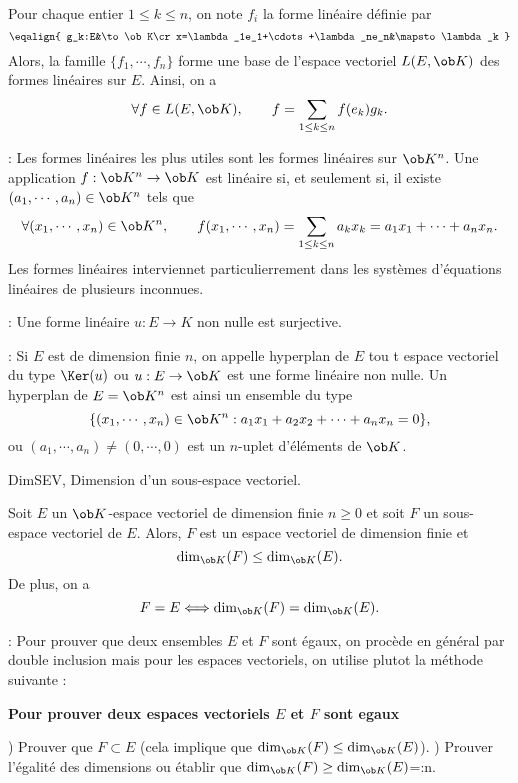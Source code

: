  Pour chaque entier $1\le k\le n$, on note $f_i$ la forme lin\'eaire d\'efinie par 
$$
\eqalign{
	g_k:E&\to\ob K\cr  
	x=\lambda_1e_1+\cdots+\lambda_ne_n&\mapsto  \lambda_k
}
$$
Alors, la famille $\{f_1,\cdots,f_n\}$ forme une base de l'espace vectoriel $\sc L(E,\ob K)$ des formes lin\'eaires sur $E$. Ainsi, on a 
$$
\forall f\in\sc L(E,\ob K), \qquad f=\sum_{1\le k\le n}f(e_k)g_k.
$$

\Remarque : Les formes lin\'eaires les plus utiles sont les formes lin\'eaires sur $\ob K^n$. Une application $f:\ob K^n\to\ob K$ est lin\'eaire si, et seulement si, il existe $(a_1,\cdots,a_n)\in\ob K^n$ tels que 
$$
\forall (x_1,\cdots,x_n)\in\ob K^n, \qquad f(x_1,\cdots,x_n)=\sum_{1\le k\le n}a_kx_k=a_1x_1+\cdots+a_nx_n.
$$
Les formes lin\'eaires interviennet particulierrement dans les syst\`emes d'\'equations lin\'eaires de plusieurs inconnues. 
\bigskip

\Remarque : Une forme lin\'eaire $u:E\to K$ non nulle est surjective. 
\bigskip

\Remarque : Si $E$ est de dimension finie $n$, on appelle hyperplan de $E$ tou t espace vectoriel du type $\Ker(u)$ ou $u:E\to\ob K$ est une forme lin\'eaire non nulle. Un hyperplan de $E=\ob K^n$ est ainsi un ensemble du type 
$$
\{(x_1,\cdots,x_n)\in\ob K^n:a_1x_1+a_2x_2+\cdots+a_nx_n=0\},
$$
ou $(a_1,\cdots,a_n)\neq (0,\cdots,0)$ est un $n$-uplet d'\'el\'ements de $\ob K$. 
\bigskip


\Subsection DimSEV, Dimension d'un sous-espace vectoriel. 
\bigskip

\Propriete []  Soit $E$ un $\ob K$-espace vectoriel de dimension finie $n\ge0$ et soit $F$ un sous-espace vectoriel de $E$. 
Alors, $F$ est un espace vectoriel de dimension finie et $$
{\dim_{\ob K}(F)\le\dim_{\ob K}(E)}. 
$$
De plus, on a 
$$
{F=E\Longleftrightarrow \dim_{\ob K}(F)=\dim_{\ob K}(E)}.
$$


\Remarque : Pour prouver que deux ensembles $E$ et $F$ sont \'egaux, on proc\`ede en g\'en\'eral par double inclusion mais pour les espaces vectoriels, on utilise plutot la m\'ethode suivante : 
\bigskip


\centerline{\bf Pour prouver deux espaces vectoriels $E$ et $F$ sont egaux}
\medskip{}) Prouver que $F\subset E$ (cela implique que $\dim_{\ob K}(F)\le \dim_{\ob K}(E)$).
\medskip
{}) Prouver l'\'egalit\'e des dimensions ou \'etablir que $\dim_{\ob K}(F)\ge \dim_{\ob K}(E)$=:n.
 
